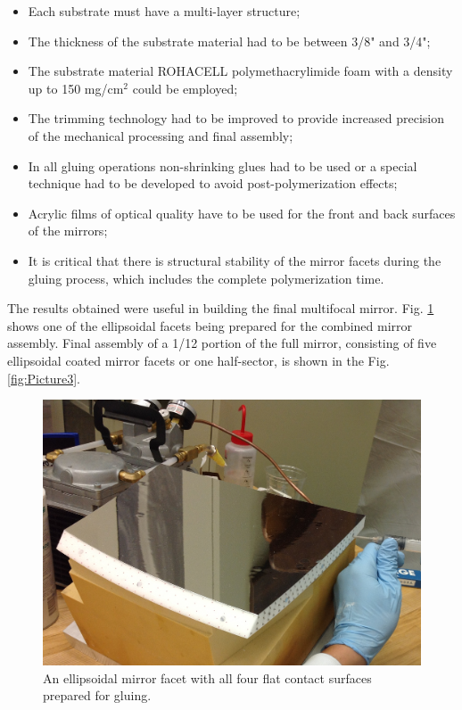 \begin{itemize}
    \item Each substrate must have a multi-layer structure;
    \item The thickness of the substrate material had to be between 3/8" and 3/4";
    \item The substrate material ROHACELL polymethacrylimide foam with a density up to 150 mg/cm$^2$ could be employed;
    \item The trimming technology had to be improved to provide increased precision of the mechanical processing and final assembly;
    \item In all gluing operations non-shrinking glues had to be used or a special technique had to be developed to avoid post-polymerization effects;
    \item Acrylic films of optical quality have to be used for the front and back surfaces of the mirrors;
    \item It is critical that there is structural stability of the mirror facets during the gluing process, which includes the complete polymerization time.
    \end{itemize}

\indent The results obtained were useful in building the final multifocal mirror. Fig. \ref{fig:facet} shows one of the ellipsoidal facets being prepared for the combined mirror assembly. Final assembly of a 1/12 portion of the full mirror, consisting of five ellipsoidal coated mirror facets or one half-sector, is shown in the Fig. \ref{fig:Picture3}.

\begin{figure}[ht]
    \centering
    \includegraphics[width=1.0\linewidth]{images/Picture2.png}
    \caption{An ellipsoidal mirror facet with all four flat contact surfaces prepared for gluing.}
    \label{fig:facet}
\end{figure}


